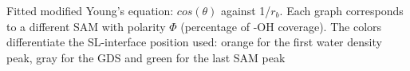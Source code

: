 \label{fig:Fitted-modified-Young}Fitted modified Young's equation:
$cos(\theta)$ against 1/$r_{b}$. Each graph corresponds to a different
SAM with polarity $\Phi$ (percentage of -OH coverage). The colors
differentiate the SL-interface position used: orange for the first
water density peak, gray for the GDS and green for the last SAM peak